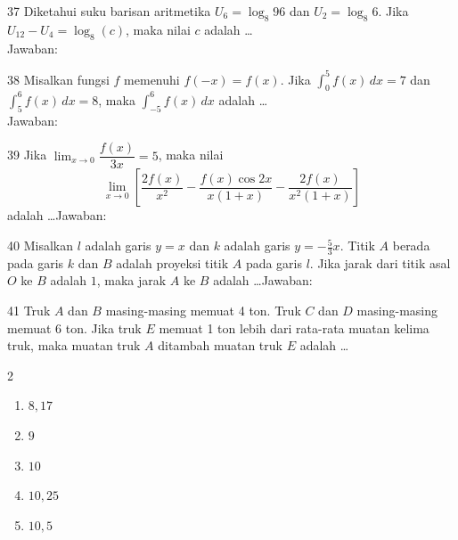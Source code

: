 \documentclass[11pt]{article}
\newenvironment{pilB}{%
  \par\smallskip\begin{multicols}{2}
  \begin{enumerate}[label=(\Alph*),leftmargin=*,itemsep=1pt,topsep=3pt]}%
  {\end{enumerate}\end{multicols}}
\begin{document}
\begin{soal}{37}
Diketahui suku barisan aritmetika $U_6=\log_8 96$ dan $U_2=\log_8 6$.
Jika $U_{12}-U_4=\log_8(c)$, maka nilai $c$ adalah \ldots\\[0.4em]
Jawaban:\enspace\underline{\hspace{4cm}}
\end{soal}

\begin{soal}{38}
Misalkan fungsi $f$ memenuhi $f(-x)=f(x)$. Jika $\int_0^5 f(x)\,dx=7$
dan $\int_5^6 f(x)\,dx=8$, maka $\displaystyle\int_{-5}^6 f(x)\,dx$
adalah \ldots\\[0.4em]
Jawaban:\enspace\underline{\hspace{4cm}}
\end{soal}

\begin{soal}{39}
Jika $\displaystyle\lim_{x\to0}\dfrac{f(x)}{3x}=5$, maka nilai
\[
  \lim_{x\to0}\left[\frac{2f(x)}{x^2}-\frac{f(x)\cos2x}{x(1+x)}-\frac{2f(x)}{x^2(1+x)}\right]
\]
adalah \ldots\hfill Jawaban:\enspace\underline{\hspace{3cm}}
\end{soal}

\begin{soal}{40}
Misalkan $l$ adalah garis $y=x$ dan $k$ adalah garis $y=-\tfrac{5}{3}x$.
Titik $A$ berada pada garis $k$ dan $B$ adalah proyeksi titik $A$ pada
garis $l$. Jika jarak dari titik asal $O$ ke $B$ adalah $1$, maka
jarak $A$ ke $B$ adalah \ldots\hfill Jawaban:\enspace\underline{\hspace{3cm}}
\end{soal}


\begin{soal}{41}
Truk $A$ dan $B$ masing-masing memuat 4 ton. Truk $C$ dan $D$
masing-masing memuat 6 ton. Jika truk $E$ memuat 1 ton lebih dari
rata-rata muatan kelima truk, maka muatan truk $A$ ditambah muatan
truk $E$ adalah \ldots
\begin{pilB}
  \item $8{,}17$ \item $9$ \item $10$ \item $10{,}25$ \item $10{,}5$
\end{pilB}
\end{soal}
\end{document}
